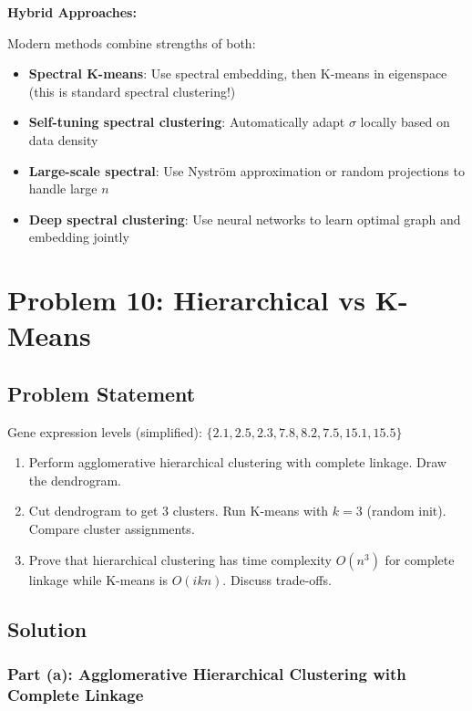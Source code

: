 \documentclass[12pt]{article}
\begin{document}
\begin{explanation}
\textbf{Hybrid Approaches:}

Modern methods combine strengths of both:
\begin{itemize}
    \item \textbf{Spectral K-means}: Use spectral embedding, then K-means in eigenspace (this is standard spectral clustering!)
    \item \textbf{Self-tuning spectral clustering}: Automatically adapt $\sigma$ locally based on data density
    \item \textbf{Large-scale spectral}: Use Nyström approximation or random projections to handle large $n$
    \item \textbf{Deep spectral clustering}: Use neural networks to learn optimal graph and embedding jointly
\end{itemize}

\end{explanation}

\section{Problem 10: Hierarchical vs K-Means}

\subsection{Problem Statement}

Gene expression levels (simplified): $\{2.1, 2.5, 2.3, 7.8, 8.2, 7.5, 15.1, 15.5\}$

\begin{enumerate}
\item[(a)] Perform agglomerative hierarchical clustering with complete linkage. Draw the dendrogram.
\item[(b)] Cut dendrogram to get 3 clusters. Run K-means with $k=3$ (random init). Compare cluster assignments.
\item[(c)] Prove that hierarchical clustering has time complexity $O(n^3)$ for complete linkage while K-means is $O(ikn)$. Discuss trade-offs.
\end{enumerate}

\subsection{Solution}

\subsubsection{Part (a): Agglomerative Hierarchical Clustering with Complete Linkage}
\end{document}
